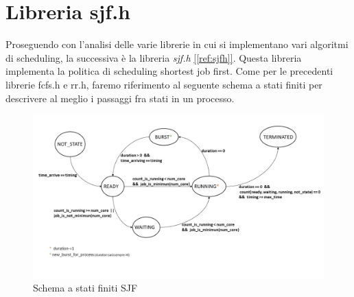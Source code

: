 \documentclass[Lau, oneside]{sapthesis}%
\begin{document}
\section{Libreria sjf.h}
\label{sec:sjf.h}
Proseguendo con l'analisi delle varie librerie in cui si implementano vari algoritmi di scheduling, la successiva è la libreria \textit{sjf.h} \hyperref[ref:sjfh]{[\ref*{ref:sjfh}]}.
Questa libreria implementa la politica di scheduling shortest job first.
Come per le precedenti librerie fcfs.h e rr.h, faremo riferimento al seguente schema a stati finiti per descrivere al meglio i passaggi fra stati in un processo.
\begin{figure}[h]
  \centering
  \includegraphics[width=1\textwidth]{schema a stati finiti SJF.jpg}
  \caption{Schema a stati finiti SJF}
\end{figure}
\end{document}
